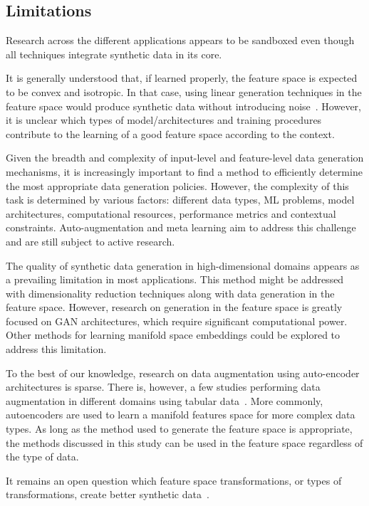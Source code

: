 \documentclass[parskip=full]{scrartcl}
\begin{document}
\subsection{Limitations}

Research across the different applications appears to be sandboxed even though
all techniques integrate synthetic data in its core.

It is generally understood that, if learned properly, the feature space is
expected to be convex and isotropic. In that case, using linear generation
techniques in the feature space would produce synthetic data without
introducing noise~\cite{cheung2020modals}. However, it is unclear which types
of model/architectures and training procedures contribute to the learning of a
good feature space according to the context.

Given the breadth and complexity of input-level and feature-level data
generation mechanisms, it is increasingly important to find a method to
efficiently determine the most appropriate data generation policies. However,
the complexity of this task is determined by various factors: different data
types, ML problems, model architectures, computational resources, performance
metrics and contextual constraints. Auto-augmentation and meta learning aim to
address this challenge and are still subject to active research.

The quality of synthetic data generation in high-dimensional domains appears
as a prevailing limitation in most applications. This method might be
addressed with dimensionality reduction techniques along with data generation
in the feature space. However, research on generation in the feature space is
greatly focused on GAN architectures, which require significant computational
power. Other methods for learning manifold space embeddings could be explored
to address this limitation.

To the best of our knowledge, research on data augmentation using auto-encoder
architectures is sparse. There is, however, a few studies performing data
augmentation in different domains using tabular data~\cite{delgado2021deep}.
More commonly, autoencoders are used to learn a manifold features space for
more complex data types. As long as the method used to generate the feature
space is appropriate, the methods discussed in this study can be used in the
feature space regardless of the type of data.

It remains an open question which feature space transformations, or types of
transformations, create better synthetic data~\cite{cheung2020modals}.
\end{document}
